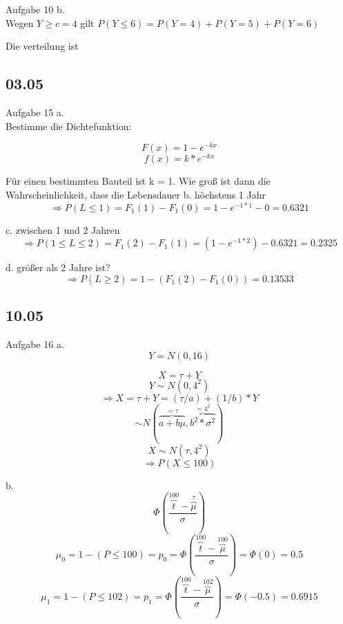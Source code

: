 Aufgabe 10 b.\\

Wegen $Y\geq c =4$ gilt $P(Y\leq 6)=P(Y=4)+P(Y=5)+P(Y=6)$



Die verteilung ist 








\subsection{03.05}

Aufgabe 15 a.\\

Bestimme die Dichtefunktion:

\[F(x)=1-e^{-kx}\]
\[f(x)=k*e^{-kx}\]

Für einen bestimmten Bauteil ist k = 1. Wie groß ist dann die Wahrscheinlichkeit, dass die Lebensdauer 
b. höchstens 1 Jahr \\

\[\Longrightarrow P(L\leq1)=F_1(1)-F_1(0)=1-e^{-1*1}-0=0.6321\]


c. zwischen 1 und 2 Jahren \\

\[ \Longrightarrow P(1 \leq L \leq 2) = F_1(2)-F_1(1) = (1-e^{-1*2}) -0.6321 = 0.2325\]


d. größer als 2 Jahre ist?\\

\[ \Longrightarrow P(L\geq 2) = 1-(F_1(2)-F_1(0))=0.13533\]

\subsection{10.05}

Aufgabe 16 a.\\

\[Y = N (0,16)\]

\[X=\tau + Y\]
\[ Y \sim  N(0,4^2)\]
\[\Longrightarrow X = \tau + Y = (\tau/a) + (1/b) * Y\]
\[\sim  N(\overbrace{a+b\mu}^{=\tau} ,\overbrace{b^2*\sigma ^2}^{= 4^2})\]
\[X \sim N(\tau, 4^2)\]
\[\Longrightarrow P(X\leq 100)\]

b.\\

\[\Phi (\frac{\overbrace{t}^{100}-\overbrace{\mu}^\tau}{\sigma})\]
\[\mu_0 = 1-(P\leq 100) = p_0=\Phi (\frac{\overbrace{t}^{100}-\overbrace{\mu}^{100}}{\sigma})=\Phi(0)=0.5 \]
\[\mu_1 = 1-(P\leq 102) = p_1=\Phi (\frac{\overbrace{t}^{100}-\overbrace{\mu}^{102}}{\sigma})=\Phi(-0.5)= 0.6915\]

